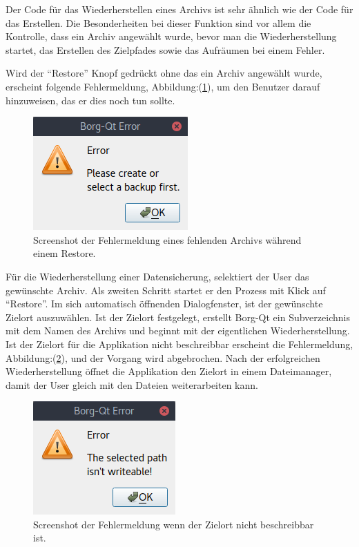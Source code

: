 Der Code für das Wiederherstellen eines Archivs ist sehr ähnlich wie der Code
für das Erstellen. Die Besonderheiten bei dieser Funktion sind vor allem die
Kontrolle, dass ein Archiv angewählt wurde, bevor man die Wiederherstellung
startet, das Erstellen des Zielpfades sowie das Aufräumen bei einem Fehler.

Wird der "`Restore"' Knopf gedrückt ohne das ein Archiv angewählt wurde, erscheint
folgende Fehlermeldung, Abbildung:(\ref{fig:org40b5f27}), um den Benutzer
darauf hinzuweisen, das er dies noch tun sollte.

\begin{figure}[H]
\centering
\includegraphics[width=.2\paperwidth]{pictures/borgqt_no_archive_selected.png}
\caption{\label{fig:org40b5f27}
Screenshot der Fehlermeldung eines fehlenden Archivs während einem Restore.}
\end{figure}

Für die Wiederherstellung einer Datensicherung, selektiert der User das
gewünschte Archiv. Als zweiten Schritt startet er den Prozess mit Klick auf
"`Restore"'. Im sich automatisch öffnenden Dialogfenster, ist der gewünschte
Zielort auszuwählen. Ist der Zielort festgelegt, erstellt Borg-Qt ein
Subverzeichnis mit dem Namen des Archivs und beginnt mit der eigentlichen
Wiederherstellung. Ist der Zielort für die Applikation nicht beschreibbar
erscheint die Fehlermeldung, Abbildung:(\ref{fig:org49c2dc3}), und der Vorgang
wird abgebrochen. Nach der erfolgreichen Wiederherstellung öffnet die
Applikation den Zielort in einem Dateimanager, damit der User gleich mit den
Dateien weiterarbeiten kann.

\begin{figure}[H]
\centering
\includegraphics[width=.2\paperwidth]{pictures/borgqt_not_writeable.png}
\caption{\label{fig:org49c2dc3}
Screenshot der Fehlermeldung wenn der Zielort nicht beschreibbar ist.}
\end{figure}

